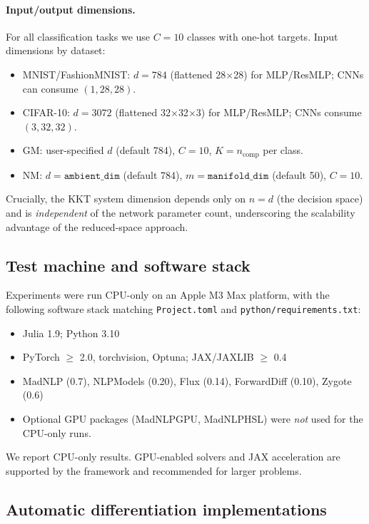\documentclass[11pt]{article}
\begin{document}
\paragraph{Input/output dimensions.} For all classification tasks we use $C=10$ classes with one-hot targets. Input dimensions by dataset:
\begin{itemize}[leftmargin=1.5em]
  \item MNIST/FashionMNIST: $d=784$ (flattened 28$\times$28) for MLP/ResMLP; CNNs can consume $(1,28,28)$.
  \item CIFAR-10: $d=3072$ (flattened 32$\times$32$\times$3) for MLP/ResMLP; CNNs consume $(3,32,32)$.
  \item GM: user-specified $d$ (default 784), $C=10$, $K=n_{\text{comp}}$ per class.
  \item NM: $d=\texttt{ambient\_dim}$ (default 784), $m=\texttt{manifold\_dim}$ (default 50), $C=10$.
\end{itemize}
Crucially, the KKT system dimension depends only on $n=d$ (the decision space) and is \emph{independent} of the network parameter count, underscoring the scalability advantage of the reduced-space approach.

\subsection{Test machine and software stack}
Experiments were run CPU-only on an Apple M3 Max platform, with the following software stack matching \texttt{Project.toml} and \texttt{python/requirements.txt}:
\begin{itemize}[leftmargin=1.5em]
  \item Julia 1.9; Python 3.10
  \item PyTorch $\ge$ 2.0, torchvision, Optuna; JAX/JAXLIB $\ge$ 0.4
  \item MadNLP (0.7), NLPModels (0.20), Flux (0.14), ForwardDiff (0.10), Zygote (0.6)
  \item Optional GPU packages (MadNLPGPU, MadNLPHSL) were \emph{not} used for the CPU-only runs.
\end{itemize}
We report CPU-only results. GPU-enabled solvers and JAX acceleration are supported by the framework and recommended for larger problems.

\subsection{Automatic differentiation implementations}
\end{document}
